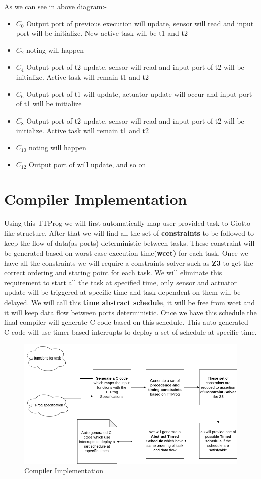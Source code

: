 \documentclass[16pt]{report}
\begin{document}
As we can see in above diagram:-
\begin{itemize}
    \item $C_{0} $ Output port of previous execution will update, sensor will read and input port will be initialize. New active task will be t1 and t2
    \item $C_{2} $ noting will happen
    \item $C_{4} $ Output port of t2 update, sensor will read and input port of t2 will be initialize. Active task will remain t1 and t2
    \item $C_{6} $ Output port of t1 will update, actuator update will occur and input port of t1 will be initialize
    \item $C_{8} $ Output port of t2 update, sensor will read and input port of t2 will be initialize. Active task will remain t1 and t2
    \item $C_{10} $ noting will happen
    \item $C_{12} $ Output port of will update, and so on
    
\end{itemize}

\section{Compiler Implementation}
Using this TTProg we will first automatically map user provided task to Giotto like structure. After that we will find all the set of \textbf{constraints} to be followed to keep the flow of data(as ports) deterministic between tasks. These constraint will be generated based on worst case execution time(\textbf{wcet)} for each task. Once we have all the constraints we will require a constraints solver such as \textbf{Z3} to get the correct ordering and staring point for each task. We will eliminate this requirement to start all the task at specified time, only sensor and actuator update will be triggered at specific time and task dependent on them will be delayed. We will call this \textbf{time abstract schedule}, it will be free from wcet and it will keep data flow between ports deterministic. Once we have this schedule the final compiler will generate C code based on this schedule. This auto generated C-code will use timer based interrupts to deploy a set of schedule at specific time.

\begin{figure}[H]
\centering
\includegraphics[width=\linewidth]{compiler.png}
\caption{Compiler Implementation}
\end{figure}
\end{document}
